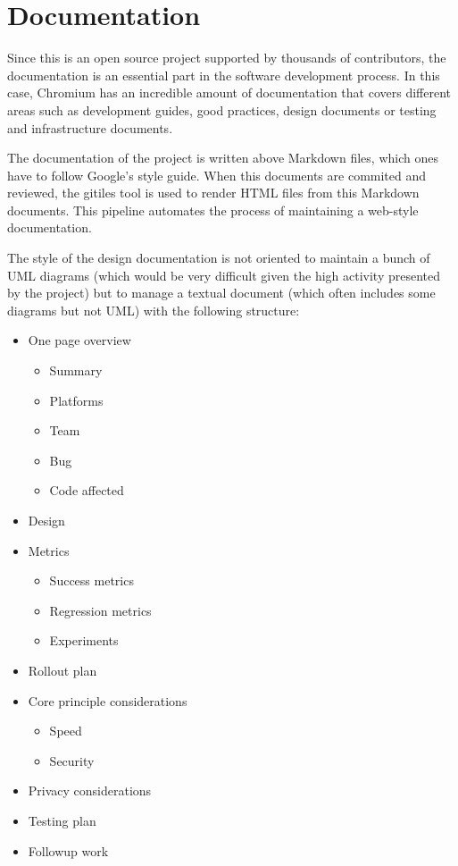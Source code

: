 \section{Documentation}

Since this is an open source project supported by thousands of contributors, the documentation is an essential part in the software development process. In this case, Chromium has an incredible amount of documentation that covers different areas such as development guides, good practices, design documents or testing and infrastructure documents.

The documentation of the project is written above Markdown files, which ones have to follow Google's style guide. When this documents are commited and reviewed, the gitiles tool is used to render HTML files from this Markdown documents. This pipeline automates the process of maintaining a web-style documentation.

The style of the design documentation is not oriented to maintain a bunch of UML diagrams (which would be very difficult given the high activity presented by the project) but to manage a textual document (which often includes some diagrams but not UML) with the following structure:
\begin{itemize}
    \item One page overview
        \begin{itemize}
            \item Summary
            \item Platforms
            \item Team
            \item Bug
            \item Code affected
        \end{itemize}
    \item Design
    \item Metrics
        \begin{itemize}
            \item Success metrics
            \item Regression metrics
            \item Experiments
        \end{itemize}
    \item Rollout plan
    \item Core principle considerations
        \begin{itemize}
            \item Speed
            \item Security
        \end{itemize}
    \item Privacy considerations
    \item Testing plan
    \item Followup work
\end{itemize}


